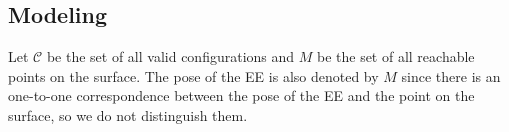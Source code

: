 \documentclass[journal]{IEEEtran}
\begin{document}
%
%
%

\subsection{Modeling}
Let $\mathscr{C}$ be the set of all valid configurations and $M$ be the set of all reachable points on the surface. The pose of the EE is also denoted by $M$ since there is an one-to-one correspondence between the pose of the EE and the point on the surface, so we do not distinguish them. 

 
\end{document}
